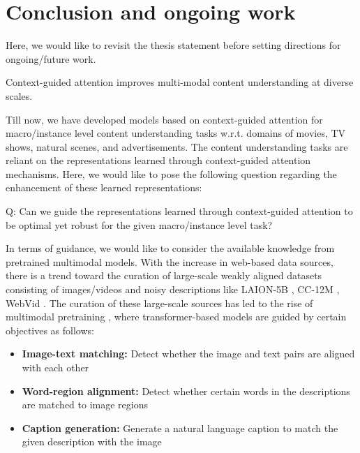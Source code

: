 \chapter{Conclusion and ongoing work}
\label{cha:conclusion}

Here, we would like to revisit the thesis statement before setting directions for ongoing/future work.

\begin{tcolorbox}[width=\textwidth]
Context-guided attention improves multi-modal content understanding at diverse scales.
\end{tcolorbox}


Till now, we have developed models based on context-guided attention for macro/instance level content understanding tasks w.r.t. domains of movies, TV shows, natural scenes, and advertisements. The content understanding tasks are reliant on the representations learned through context-guided attention mechanisms. Here, we would like to pose the following question regarding the enhancement of these learned representations:

\begin{itshape}
Q: Can we guide the representations learned through context-guided attention to be optimal yet robust for the given macro/instance level task?
\label{context:macro instance level}
\end{itshape}

In terms of guidance, we would like to consider the available knowledge from pretrained multimodal models. With the increase in web-based data sources, there is a trend toward the curation of large-scale weakly aligned datasets consisting of images/videos and noisy descriptions like LAION-5B \cite{schuhmann2022laionb}, CC-12M \cite{changpinyo2021cc12m}, WebVid \cite{Bain21}. The curation of these large-scale sources has led to the rise of multimodal pretraining \cite{wang2022MMPTMSurvey}, where transformer-based models are guided by certain objectives as follows:
\begin{itemize}

  \item \textbf{Image-text matching:} Detect whether the image and text pairs are aligned with each other  
 \item \textbf{Word-region alignment:} Detect whether certain words in the descriptions are matched to image regions
 \item \textbf{Caption generation:} Generate a natural language caption to match the given description with the image
 
\end{itemize}

